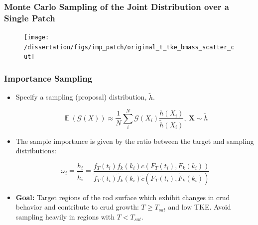 \documentclass[t, pdftex]{beamer}
\DeclareMathOperator*{\E}{\mathbb{E}}
\begin{document}
\begin{frame}
\frametitle{\small Monte Carlo Sampling of the Joint Distribution over a Single Patch}
\vspace{-19pt}
\begin{figure}[!htbp]
    \centering
    \texttt{[image: /dissertation/figs/imp\_patch/original\_t\_tke\_bmass\_scatter\_cut]}
    \label{model_overview}
\end{figure}
\end{frame}

\begin{frame}
\frametitle{Importance Sampling}
\vspace{-16pt}
\begin{itemize}
    \item Specify a sampling (proposal) distribution, $\tilde h$.

\begin{equation}
\E(\mathcal G(X)) \approx \frac{1}{N} \sum_i^N \mathcal G(X_i) \frac{h(X_i)}{\tilde h(X_i)}, \ \mathbf{X} \sim \tilde{h} \nonumber
\label{eq:mc_imp_expected_crud}
\end{equation}

\item The sample importance is given by the ratio between the target and sampling distributions:
    
    \begin{equation}
    \omega_i = \frac{h_i}{\tilde h_i} = \frac{f_T(t_i) f_k(k_i)c(F_T(t_i), F_k(k_i))}{\tilde f_T(t_i) \tilde f_k(k_i) \tilde c(\tilde F_T(t_i), \tilde F_k(k_i))} \nonumber
    \label{eq:imp_prob_ratio}
    \end{equation}

    \item \textbf{Goal:}  Target regions of the rod surface which exhibit changes in crud behavior and contribute to crud growth: $T \ge T_{sat}$ and low TKE.  Avoid sampling heavily in regions with $T<T_{sat}$.
\end{itemize}
\end{frame}

\end{document}
